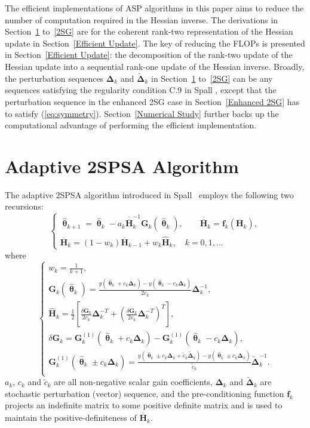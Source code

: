 \documentclass[conference,10.3cpt]{IEEEtran}
\newcommand{\bG}{\bm{G}}
\newcommand{\bDelta}{\bm{\Delta}}
\newcommand{\oH}{\bm{\overline{H}}}
\newcommand{\ooH}{\bm{\overline{\overline{H}}}}
\newcommand{\hH}{\bm{\hat{H}}}
\newcommand{\htheta}{\bm{\hat{\uptheta}}}
\newcommand{\tDelta}{\bm{\tilde{\Delta}}}
\begin{document}
The efficient implementations of ASP algorithms in this paper aims to reduce the number of computation required in the Hessian inverse. The derivations in Section~\ref{2SPSA} to~\ref{2SG} are for the coherent rank-two representation of the Hessian update in Section~\ref{Efficient Update}. The key of reducing the FLOPs is presented in Section~\ref{Efficient Update}: the decomposition of the rank-two update of the Hessian update into a sequential rank-one update of the Hessian inverse. Broadly, the perturbation sequences $\bDelta_k$ and
$\tDelta_k$ in Section~\ref{2SPSA} to~\ref{2SG} can be any sequences
satisfying the regularity condition C.9 in Spall
\cite{Spall2009}, except that the perturbation sequence in the enhanced 2SG case in Section~\ref{Enhanced 2SG} has to satisfy (\ref{eq:symmetry}). Section~\ref{Numerical Study} further backs up the computational advantage of performing the efficient implementation. 

\section{Adaptive 2SPSA Algorithm}  \label{2SPSA}
The adaptive 2SPSA algorithm introduced in Spall~\cite{Spall2000} employs the following
two recursions:
\begin{equation} \label{eq:Adaptation}
  \begin{cases}
    \htheta_{k+1}=\htheta_k-a_k\ooH_k^{-1} \bG_k(\htheta_k),
  \qquad \bm{\ooH}_k=\bm{f}_k(\oH_k),\\ \oH_k= (1 - w_k) \oH_{k-1}+ w_k \hH_k,
 \quad k=0,1,\dots
  \end{cases}
\end{equation}
where
\begin{equation} \label{eq:notations}
  \begin{cases} w_k=\frac{1}{k+1},\\
    \bG_k(\htheta_k)=\frac{y(\htheta_k+c_k\bDelta_k)-y(\htheta_k-c_k\bDelta_k)}{2c_k}\bDelta_k^{-1},\\
    \hH_k=\frac{1}{2}\left[
      \frac{\delta\bG_k}{2c_k}\bDelta_k^{-T}+\left(\frac{\delta\bG_k}{2c_k}\bDelta_k^{-T}\right)^T \right],\\
    \delta\bG_k=\bG_k^{(1)}(\htheta_k+ c_k\bDelta_k)-\bG_k^{(1)}(\htheta_k- c_k\bDelta_k),\\
    \bG_k^{(1)}(\htheta_k\pm c_k\bDelta_k) =\frac{y(\htheta_k\pm c_k\bDelta_k+\tilde{c}_k\tDelta_k)-y(\htheta_k\pm c_k\bDelta_k)}{\tilde{c}_k}\tDelta_k^{-1}.\\
  \end{cases}
\end{equation} $ a_k $, $ c_k $ and $ \tilde{c}_k $ are all
non-negative scalar gain coefficients, $ \bDelta_k $ and $ \tDelta_k $
are stochastic perturbation (vector) sequence, and the
pre-conditioning function $ \bm{f}_k $ projects an indefinite matrix
to some positive definite matrix and is used to maintain the
positive-definiteness of $\ooH_k$.
\end{document}
